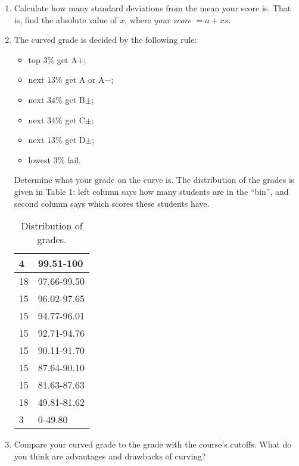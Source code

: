 \documentclass[12pt]{amsart}
\begin{document}
\begin{enumerate}[label=\arabic*.,itemsep=10pt, leftmargin=*]
\begin{enumerate}
    \item Calculate how many standard deviations from the mean your score is. That is, find the absolute value of $x$, where \textit{your score} $= a + xs$.
    \item The curved grade is decided by the following rule:
    \begin{itemize}
        \item top $3\%$ get A$+$;
        \item next $13\%$ get A or A$-$;
        \item next $34\%$ get B$\pm$;
        \item next $34\%$ get C$\pm$;
        \item next $13\%$ get D$\pm$;
        \item lowest $3\%$ fail.
    \end{itemize}
    Determine what your grade on the curve is. The distribution of the grades is given in  Table 1: left column says how many students are in the ``bin'', and second column says which scores these students have.
\begin{table}[]
\begin{tabular}{|l|l|}
\hline
4  & 99.51-100   \\ \hline
18 & 97.66-99.50 \\ \hline
15 & 96.02-97.65 \\ \hline
15 & 94.77-96.01 \\ \hline
15 & 92.71-94.76 \\ \hline
15 & 90.11-91.70 \\ \hline
15 & 87.64-90.10 \\ \hline
15 & 81.63-87.63 \\ \hline
18 & 49.81-81.62 \\ \hline
3  & 0-49.80     \\ \hline
\end{tabular}
\caption{Distribution of grades.}
\end{table}   
\item Compare your curved grade to the grade with the course's cutoffs. What do you think are advantages and drawbacks of curving?

\end{enumerate}


\end{enumerate}
\end{document}
